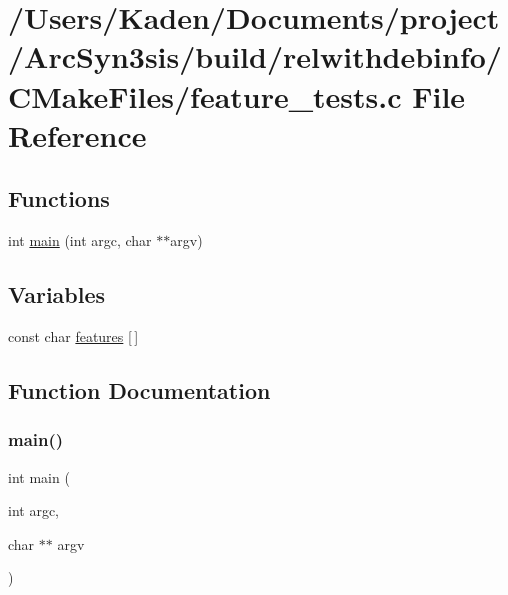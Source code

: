 \hypertarget{a00816}{}\section{/\+Users/\+Kaden/\+Documents/project/\+Arc\+Syn3sis/build/relwithdebinfo/\+C\+Make\+Files/feature\+\_\+tests.c File Reference}
\label{a00816}
\subsection*{Functions}
\begin{DoxyCompactItemize}
\item 
int \hyperlink{a00816_a3c04138a5bfe5d72780bb7e82a18e627}{main} (int argc, char $\ast$$\ast$argv)
\end{DoxyCompactItemize}
\subsection*{Variables}
\begin{DoxyCompactItemize}
\item 
const char \hyperlink{a00816_a1582568e32f689337602a16bf8a5bff0}{features} \mbox{[}$\,$\mbox{]}
\end{DoxyCompactItemize}


\subsection{Function Documentation}
\mbox{\label{a00816_a3c04138a5bfe5d72780bb7e82a18e627}} 
\subsubsection{\texorpdfstring{main()}{main()}}
{\footnotesize\ttfamily int main (\begin{DoxyParamCaption}\item[{int}]{argc,  }\item[{char $\ast$$\ast$}]{argv }\end{DoxyParamCaption})}




